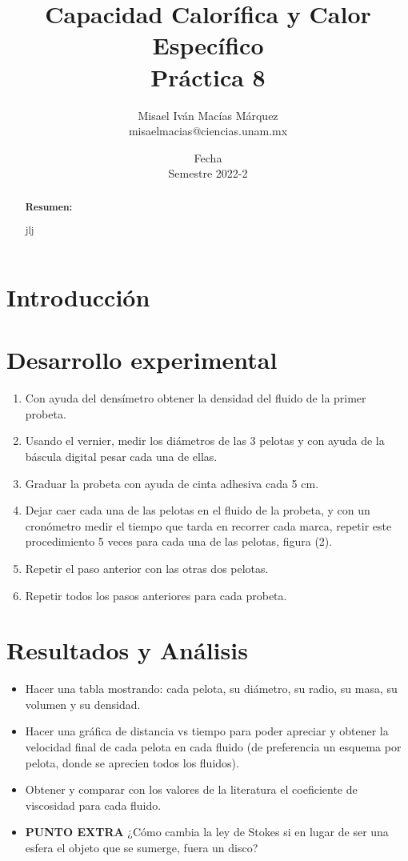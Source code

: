 \documentclass[DIV=calc, paper=a4, fontsize=11pt]{scrartcl}
\title{Capacidad Calorífica y Calor Específico\\ %
Práctica 8} %
\author{Misael Iván Macías Márquez\\
misaelmacias@ciencias.unam.mx}
\date{Fecha\\Semestre 2022-2}
\begin{document}
\maketitle


\begin{abstract}
\textbf{Resumen:} 


jlj
\end{abstract}

\begin{multicols}{2}




\section*{Introducción}





\section*{Desarrollo experimental}
\begin{enumerate}
\item Con ayuda del dens\'imetro obtener la densidad del fluido de la primer probeta.
\item Usando el vernier, medir los diámetros de las 3 pelotas y con ayuda de la báscula digital pesar cada una de ellas.
\item Graduar la probeta con ayuda de cinta adhesiva cada 5 cm.
\item Dejar caer cada una de las pelotas en el fluido de la probeta, y con un cronómetro medir el tiempo que tarda en recorrer cada marca, repetir este procedimiento 5 veces para cada una de las pelotas, figura (2).
\item Repetir el paso anterior con las otras dos pelotas.
\item Repetir todos los pasos anteriores para cada probeta.
\end{enumerate}


\section*{Resultados y Análisis}
\begin{itemize}
\item Hacer una tabla mostrando: cada pelota, su di\'ametro, su radio, su masa, su volumen y su densidad.
\item Hacer una gr\'afica de distancia vs tiempo para poder apreciar y obtener la velocidad final de cada pelota en cada fluido (de preferencia un esquema por pelota, donde se aprecien todos los fluidos).
\item Obtener y comparar con los valores de la literatura el coeficiente de viscosidad para cada fluido.
\item \textbf{PUNTO EXTRA} ¿C\'omo cambia la ley de Stokes si en lugar de ser una esfera el objeto que se sumerge, fuera un disco?
\end{itemize}


\end{multicols}
\end{document}

